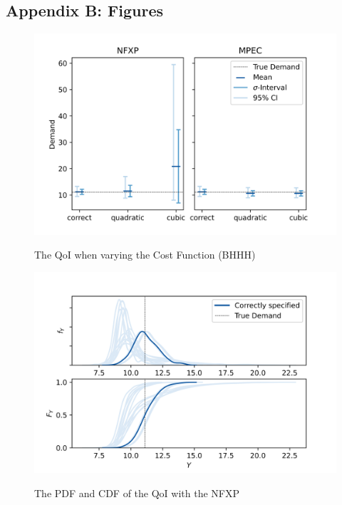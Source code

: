 \subsection{Appendix B: Figures}

\begin{figure}[H]
	\caption{The QoI when varying the Cost Function (BHHH)}
	\vspace*{-4mm}
	\centering
	\includegraphics[scale=0.9]{../figures/figure_12.png}
	\label{figure12}
\end{figure}

\begin{figure}[H]
	\caption{The PDF and CDF of the QoI with the NFXP}
	\vspace*{-4mm}
	\centering
	\includegraphics[scale=0.9]{../figures/figure_13.png}
	\label{figure13}
\end{figure}
